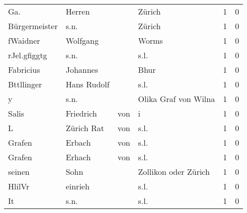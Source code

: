 \begin{center}
\begin{tiny}
\begin{longtabu}{llllrr}
                      Ga. &                             Herren &             &                                      Zürich &          1 &         0 \\
            Bürgermeister &                               s.n. &             &                                      Zürich &          1 &         0 \\
                 fWaidner &                           Wolfgang &             &                                       Worms &          1 &         0 \\
             rJel.gfiggtg &                               s.n. &             &                                        s.l. &          1 &         0 \\
                Fabricius &                           Johannes &             &                                        Bhur &          1 &         0 \\
               Bttllinger &                        Hans Rudolf &             &                                        s.l. &          1 &         0 \\
                        y &                               s.n. &             &                        Olika Graf von Wilna &          1 &         0 \\
                    Salis &                          Friedrich &         von &                                           i &          1 &         0 \\
                        L &                         Zürich Rat &         von &                                        s.l. &          1 &         0 \\
                   Grafen &                             Erbach &         von &                                        s.l. &          1 &         0 \\
                   Grafen &                             Erhach &         von &                                        s.l. &          1 &         0 \\
                   seinen &                               Sohn &             &                        Zollikon oder Zürich &          1 &         0 \\
                   HlilVr &                            einrieh &             &                                        s.l. &          1 &         0 \\
                       It &                               s.n. &             &                                        s.l. &          1 &         0 \\

\end{longtabu}
\end{tiny}
\end{center}
